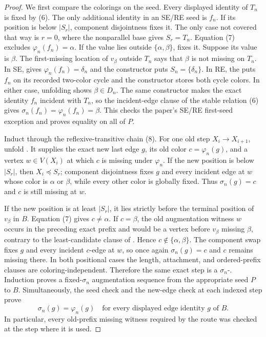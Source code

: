 \begin{proof}
We first compare the colorings on the seed.  Every displayed identity of
$T_n$ is fixed by (6).  The only additional identity in an SE/RE seed is
$f_n$.  If its position is below $|S_r|$, component disjointness fixes it.
The only case not covered that way is $r=0$, where the nonparallel base
gives $S_r=T_n$.  Equation (7) excludes
$\varphi_n(f_n)=\alpha$.  If the value lies outside
$\{\alpha,\beta\}$,  fixes it.  Suppose
its value is $\beta$.  The first-missing location of $v_\beta$ outside
$T_n$ says that $\beta$ is not missing on $T_n$.  In SE,
 gives
$\varphi_n(f_n)=\delta_n$ and the constructor puts
$S_n=\{\delta_n\}$.  In RE, the
 puts $f_n$ on its recorded
two-color cycle and the constructor stores both cycle colors.  In either
case, unfolding  shows
$\beta\in D_n$.  The same constructor makes the exact identity $f_n$
incident with $T_n$, so the incident-edge clause of the stable relation
(6) gives $\sigma_n(f_n)=\varphi_n(f_n)=\beta$.  This checks the paper's
SE/RE first-seed exception and proves equality on all of $P$.

Induct through the reflexive-transitive chain (8).  For one old step
$X_i\longrightarrow X_{i+1}$, unfold
.  It supplies the exact new last edge
$g$, its old color $c=\varphi_n(g)$, and a vertex
$w\in V(X_i)$ at which $c$ is missing under $\varphi_n$.
If the new position is below $|S_r|$, then $X_i\preccurlyeq S_r$;
component disjointness fixes $g$ and every incident edge at $w$ whose
color is $\alpha$ or $\beta$, while every other color is globally fixed.
Thus $\sigma_n(g)=c$ and $c$ is still missing at $w$.

If the new position is at least $|S_r|$, it lies strictly before the
terminal position of $v_\beta$ in $B$.  Equation (7) gives
$c\ne\alpha$.  If $c=\beta$, the old augmentation witness $w$ occurs in
the preceding exact prefix and would be a vertex before $v_\beta$ missing
$\beta$, contrary to the least-candidate clause of
.  Hence
$c\notin\{\alpha,\beta\}$.  The component swap fixes $g$ and every
incident $c$-edge at $w$, so once again $\sigma_n(g)=c$ and $c$ remains
missing there.  In both positional cases the length, attachment, and
ordered-prefix clauses are coloring-independent.  Therefore the same
exact step is a $\sigma_n$-.  Induction
proves a fixed-$\sigma_n$ augmentation sequence from the appropriate
seed $P$ to $B$.  Simultaneously, the seed check and the new-edge check
at each indexed step prove
\[
 \sigma_n(g)=\varphi_n(g)
 \quad\text{for every displayed edge identity }g\text{ of }B.  \tag{9}
\]
In particular, every old-prefix missing witness required by the route
was checked at the step where it is used.


\end{proof}
